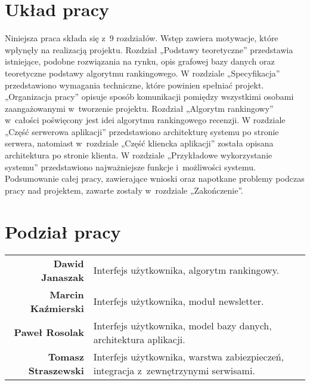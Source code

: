 \section{Układ pracy}
Niniejsza praca składa się z~9 rozdziałów. Wstęp zawiera motywacje, które wpłynęły na realizacją projektu. Rozdział „Podstawy teoretyczne” przedstawia istniejące, podobne rozwiązania na rynku, opis grafowej bazy danych oraz teoretyczne podstawy algorytmu rankingowego. W rozdziale „Specyfikacja” przedstawiono wymagania techniczne, które powinien spełniać projekt. „Organizacja pracy” opisuje sposób komunikacji pomiędzy wszystkimi osobami zaangażowanymi w~tworzenie projektu.  Rozdział „Algorytm rankingowy” w~całości poświęcony jest idei algorytmu rankingowego recenzji. W rozdziale „Część serwerowa aplikacji” przedstawiono architekturę systemu po stronie serwera, natomiast w~rozdziale „Część kliencka aplikacji” została opisana architektura po stronie klienta. W rozdziale „Przykładowe wykorzystanie systemu” przedstawiono najważniejsze funkcje i~możliwości systemu. Podsumowanie całej pracy, zawierające wnioski oraz napotkane problemy podczas pracy nad projektem, zawarte zostały w~rozdziale „Zakończenie”.


\section{Podział pracy}
\noindent\begin{tabular}{rp{9cm}}
\textbf{Dawid Janaszak} & Interfejs użytkownika, algorytm rankingowy.\\

\textbf{Marcin Kaźmierski} & Interfejs użytkownika, moduł newsletter.\\

\textbf{Paweł Rosolak} & Interfejs użytkownika, model bazy danych, architektura aplikacji.\\

\textbf{Tomasz Straszewski} & Interfejs użytkownika, warstwa zabiezpieczeń, integracja z~zewnętrzynymi serwisami.\\
\end{tabular}

